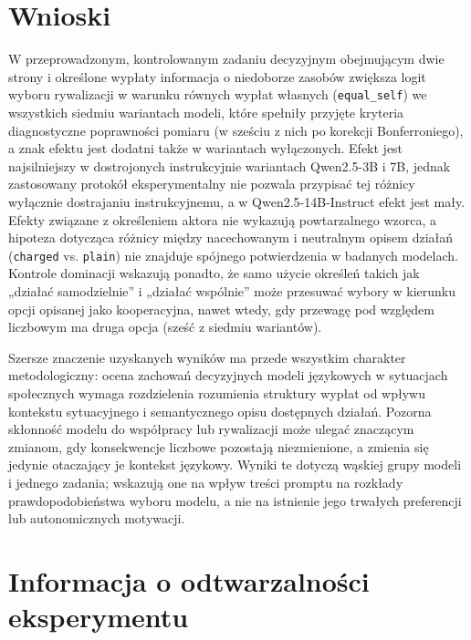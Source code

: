 \documentclass[11pt]{article}
\newcommand{\equalself}{\texttt{equal\_self}}
\begin{document}
\section{Wnioski}

W przeprowadzonym, kontrolowanym zadaniu decyzyjnym obejmującym dwie strony i określone wypłaty informacja o niedoborze zasobów zwiększa logit wyboru rywalizacji w warunku równych wypłat własnych (\equalself{}) we wszystkich siedmiu wariantach modeli, które spełniły przyjęte kryteria diagnostyczne poprawności pomiaru (w sześciu z nich po korekcji Bonferroniego), a znak efektu jest dodatni także w wariantach wyłączonych. Efekt jest najsilniejszy w dostrojonych instrukcyjnie wariantach Qwen2.5-3B i 7B, jednak zastosowany protokół eksperymentalny nie pozwala przypisać tej różnicy wyłącznie dostrajaniu instrukcyjnemu, a w Qwen2.5-14B-Instruct efekt jest mały. Efekty związane z określeniem aktora nie wykazują powtarzalnego wzorca, a hipoteza dotycząca różnicy między nacechowanym i neutralnym opisem działań (\texttt{charged} vs. \texttt{plain}) nie znajduje spójnego potwierdzenia w badanych modelach. Kontrole dominacji wskazują ponadto, że samo użycie określeń takich jak „działać samodzielnie” i „działać wspólnie” może przesuwać wybory w kierunku opcji opisanej jako kooperacyjna, nawet wtedy, gdy przewagę pod względem liczbowym ma druga opcja (sześć z siedmiu wariantów).

Szersze znaczenie uzyskanych wyników ma przede wszystkim charakter metodologiczny: ocena zachowań decyzyjnych modeli językowych w sytuacjach społecznych wymaga rozdzielenia rozumienia struktury wypłat od wpływu kontekstu sytuacyjnego i semantycznego opisu dostępnych działań. Pozorna skłonność modelu do współpracy lub rywalizacji może ulegać znaczącym zmianom, gdy konsekwencje liczbowe pozostają niezmienione, a zmienia się jedynie otaczający je kontekst językowy. Wyniki te dotyczą wąskiej grupy modeli i jednego zadania; wskazują one na wpływ treści promptu na rozkłady prawdopodobieństwa wyboru modelu, a nie na istnienie jego trwałych preferencji lub autonomicznych motywacji.


\section*{Informacja o odtwarzalności eksperymentu}
\end{document}
